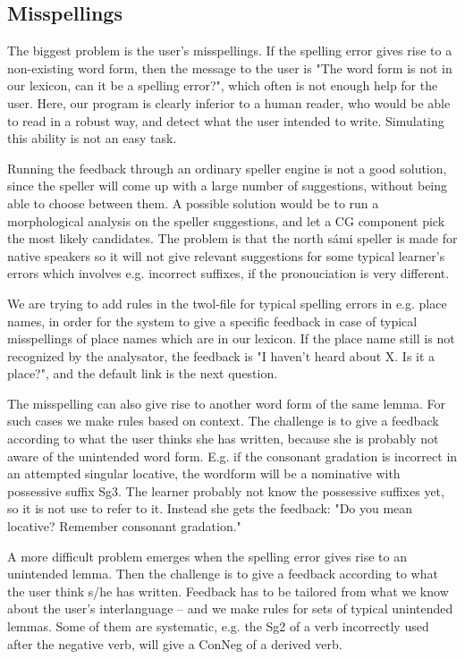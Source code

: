 \documentclass[11pt]{article}
\begin{document}
\subsection{Misspellings}
The biggest problem is the user's misspellings. If the spelling error gives rise to a non-existing word form, then the message to the user is "The word form is not in our lexicon, can it be a spelling error?", which often is not enough help for the user. Here, our program is clearly inferior to a human reader, who would be able to read in a robust way, and detect what the user intended to write. Simulating this ability is not an easy task.
 
Running the feedback through an ordinary speller engine is not a good solution, since the speller will come up with a large number of suggestions, without being able to choose between them. A possible solution would be to run a morphological analysis on the speller suggestions, and let a CG component pick the most likely candidates. The problem is that the north sámi speller is made for native speakers so it will not give relevant suggestions for some typical learner's errors which involves e.g. incorrect suffixes, if the pronouciation is very different. 

We are trying to add rules in the twol-file for typical spelling errors in e.g. place names, in order for the system to give a specific feedback in case of typical misspellings of place names which are in our lexicon. If the place name still is not recognized by the analysator, the feedback is "I haven’t heard about X. Is it a 
place?", and the default link is the next question.

The misspelling can also give rise to another word form of the same lemma. For such cases we make rules based on context. The challenge is to give a feedback according to what the user thinks she has written, because she is probably not aware of the unintended word form. E.g. if the consonant gradation is incorrect in an attempted singular locative, the wordform will be a nominative with possessive suffix Sg3. The learner probably not know the possessive suffixes yet, so it is not use to refer to it. Instead she gets the feedback: "Do you mean locative? Remember consonant gradation." 

A more difficult problem emerges when the spelling error gives rise to an unintended lemma. Then the challenge is to give a feedback according to what the user think s/he has written. Feedback has to be tailored from what we know about the user’s interlanguage – and we make rules for sets of typical unintended lemmas. Some of them are systematic, e.g. the Sg2 of a verb incorrectly used after the negative verb, will give a ConNeg of a derived verb.  
\end{document}
